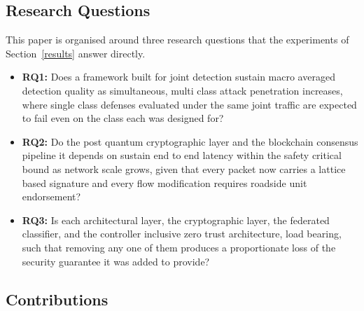 \documentclass[lettersize,journal]{IEEEtran}
\theoremstyle{plain}
\theoremstyle{remark}
\begin{document}
	\subsection{Research Questions}\label{subsec:research_questions}
	
	This paper is organised around three research questions that the
	experiments of Section~\ref{results} answer directly.
	\begin{itemize}
		\item \textbf{RQ1:} Does a framework built for joint detection sustain
		macro averaged detection quality as simultaneous, multi class attack
		penetration increases, where single class defenses evaluated under
		the same joint traffic are expected to fail even on the class each
		was designed for?
		\item \textbf{RQ2:} Do the post quantum cryptographic layer and the
		blockchain consensus pipeline it depends on sustain end to end
		latency within the safety critical bound as network scale grows,
		given that every packet now carries a lattice based signature and
		every flow modification requires roadside unit endorsement?
		\item \textbf{RQ3:} Is each architectural layer, the cryptographic
		layer, the federated classifier, and the controller inclusive zero
		trust architecture, load bearing, such that removing any one of them
		produces a proportionate loss of the security guarantee it was added
		to provide?
	\end{itemize}
	
	\subsection{Contributions}\label{subsec:contributions}
	
\end{document}
